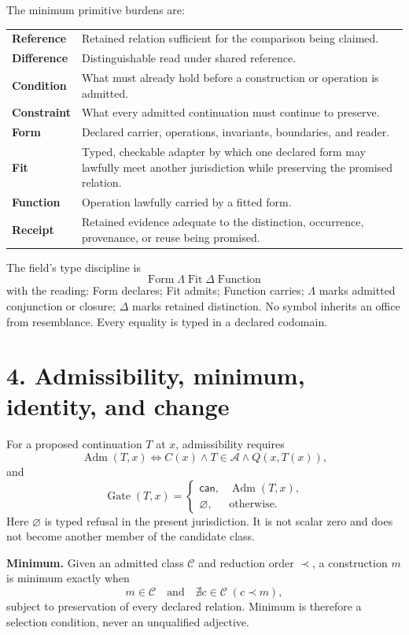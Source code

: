 \documentclass[10.5pt]{article}
\newcommand{\Gate}{\operatorname{Gate}}
\newcommand{\Adm}{\operatorname{Adm}}
\begin{document}
The minimum primitive burdens are:
\begin{center}
\begin{tabularx}{0.97\textwidth}{>{\bfseries}p{}X}
\toprule
Reference & Retained relation sufficient for the comparison being claimed.\\
Difference & Distinguishable read under shared reference.\\
Condition & What must already hold before a construction or operation is admitted.\\
Constraint & What every admitted continuation must continue to preserve.\\
Form & Declared carrier, operations, invariants, boundaries, and reader.\\
Fit & Typed, checkable adapter by which one declared form may lawfully meet another jurisdiction while preserving the promised relation.\\
Function & Operation lawfully carried by a fitted form.\\
Receipt & Retained evidence adequate to the distinction, occurrence, provenance, or reuse being promised.\\
\bottomrule
\end{tabularx}
\end{center}

The field's type discipline is
\[
\boxed{\text{Form}\;\Lambda\;\text{Fit}\;\Delta\;\text{Function}}
\]
with the reading: Form declares; Fit admits; Function carries; $\Lambda$ marks admitted conjunction or closure; $\Delta$ marks retained distinction. No symbol inherits an office from resemblance. Every equality is typed in a declared codomain.

\section*{4. Admissibility, minimum, identity, and change}
For a proposed continuation $T$ at $x$, admissibility requires
\[
\Adm(T,x)\iff C(x)\wedge T\in\mathcal A\wedge Q(x,T(x)),
\]
and
\[
\Gate(T,x)=
\begin{cases}
\mathsf{can},&\Adm(T,x),\\
\varnothing,&\text{otherwise}.
\end{cases}
\]
Here $\varnothing$ is typed refusal in the present jurisdiction. It is not scalar zero and does not become another member of the candidate class.

\textbf{Minimum.} Given an admitted class $\mathcal C$ and reduction order $\prec$, a construction $m$ is minimum exactly when
\[
m\in\mathcal C
\quad\text{and}\quad
\nexists c\in\mathcal C\;(c\prec m),
\]
subject to preservation of every declared relation. Minimum is therefore a selection condition, never an unqualified adjective.
\end{document}
